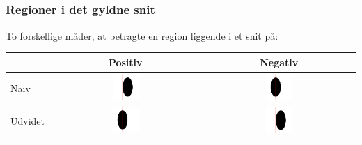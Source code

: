 \documentclass[xcolor=table]{beamer}
\begin{document}
\subsection*{}
\begin{frame}

    \frametitle{Regioner i det gyldne snit}

    To forskellige måder, at betragte en region liggende i et snit på:

    \begin{center}
        \begin{tabular}{l|cc}
            & Positiv & Negativ\\\hline
            Naiv    & \includegraphics[width=0.18\textwidth]{billeder/pnaiv_nudvidet} & \includegraphics[width=0.18\textwidth]{billeder/pudvidet_nnaiv}\\
            Udvidet & \includegraphics[width=0.18\textwidth]{billeder/pudvidet_nnaiv} & \includegraphics[width=0.18\textwidth]{billeder/pnaiv_nudvidet}
        \end{tabular}
    \end{center}

\end{frame}
\end{document}
